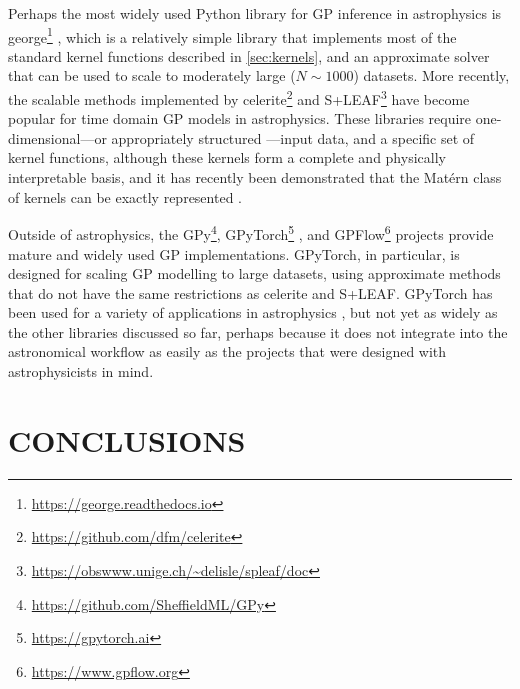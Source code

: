 \documentclass[letterpaper]{ar-1col}
\newcommand{\project}[1]{\textsf{#1}}
\begin{document}
Perhaps the most widely used \project{Python} library for GP inference in astrophysics is \project{george}\footnote{\url{https://george.readthedocs.io}} \citep{george}, which is a relatively simple library that implements most of the standard kernel functions described in \autoref{sec:kernels}, and an approximate solver that can be used to scale to moderately large ($N \sim 1000$) datasets.
More recently, the scalable methods implemented by \project{celerite}\footnote{\url{https://github.com/dfm/celerite}} \citep{celerite} and \project{S+LEAF}\footnote{\url{https://obswww.unige.ch/~delisle/spleaf/doc}} \citep{2020A&A...638A..95D, 2022A&A...659A.182D} have become popular for time domain GP models in astrophysics.
These libraries require one-dimensional---or appropriately structured \citep{2020AJ....160..240G, 2022A&A...659A.182D}---input data, and a specific set of kernel functions, although these kernels form a complete \citep{JMLR:v22:21-0072} and physically interpretable \citep{celerite} basis, and it has recently been demonstrated that the Mat\'ern class of kernels can be exactly represented \citep{2021RNAAS...5..107J}.

Outside of astrophysics, the \project{GPy}\footnote{\url{https://github.com/SheffieldML/GPy}}, \project{GPyTorch}\footnote{\url{https://gpytorch.ai}} \citep{gpytorch}, and \project{GPFlow}\footnote{\url{https://www.gpflow.org}} \citep{GPflow2017, GPflow2020multioutput} projects provide mature and widely used GP implementations.
\project{GPyTorch}, in particular, is designed for scaling GP modelling to large datasets, using approximate methods \citep[e.g.,][]{kissgp, 2015arXiv151101870W} that do not have the same restrictions as \project{celerite} and \project{S+LEAF}.
\project{GPyTorch} has been used for a variety of applications in astrophysics \citep[e.g.,][]{2022A&A...658A.166D, 2022MNRAS.511.5597L}, but not yet as widely as the other libraries discussed so far, perhaps because it does not integrate into the astronomical workflow as easily as the projects that were designed with astrophysicists in mind.

\section{CONCLUSIONS}
\label{sec:concl}
\end{document}
